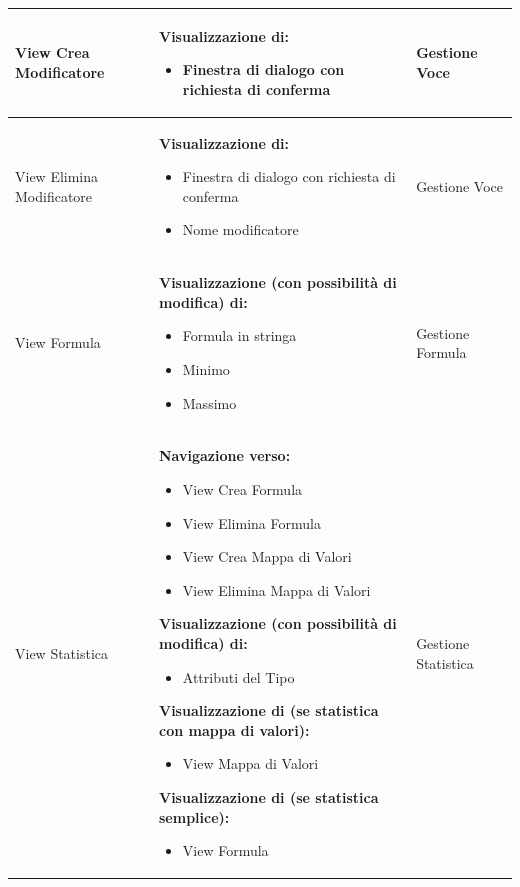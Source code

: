 \documentclass[a4paper, 11pt]{article}
\begin{document}
\begin{adjustwidth}{-1.5cm}{-1.5cm}
\begin{center}
\begin{longtable}{|p{5cm}|p{5cm}|p{5cm}|}
        View Crea Modificatore & 
        \textbf{Visualizzazione di:}
        \begin{itemize}
            \item Finestra di dialogo con richiesta di conferma
        \end{itemize} & Gestione Voce
        \\ \hline

        View Elimina Modificatore & 
        \textbf{Visualizzazione di:}
        \begin{itemize}
            \item Finestra di dialogo con richiesta di conferma
            \item Nome modificatore
        \end{itemize} & Gestione Voce
        \\ \hline
        
        View Formula & 
        \textbf{Visualizzazione (con possibilità di modifica) di:}
        \begin{itemize}
            \item Formula in stringa
            \item Minimo
            \item Massimo
        \end{itemize} & 
         Gestione Formula \\\hline
        
        View Statistica & \textbf{Navigazione verso:}
        \begin{itemize}
            \item View Crea Formula
            \item View Elimina Formula 
            \item View Crea Mappa di Valori
            \item View Elimina Mappa di Valori
        \end{itemize}
        \textbf{Visualizzazione (con possibilità di modifica) di:}
        \begin{itemize}
            \item Attributi del Tipo
        \end{itemize}
        \textbf{Visualizzazione di (se statistica con mappa di valori):}
        \begin{itemize}
            \item View Mappa di Valori
        \end{itemize}
        \textbf{Visualizzazione di (se statistica semplice):}
        \begin{itemize}
            \item View Formula
        \end{itemize} & Gestione Statistica
        \\ \hline
        

\end{longtable}
\end{center}
\end{adjustwidth}
\end{document}
